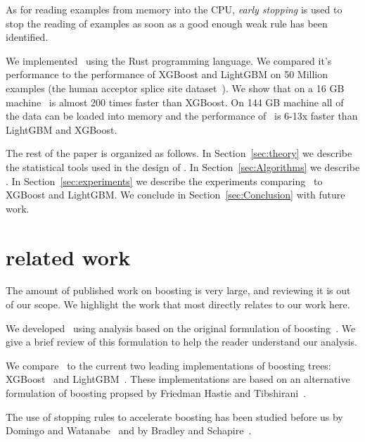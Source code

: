 As for reading examples from memory into the CPU, {\em early stopping}
is used to stop the reading of examples as soon as a good enough weak
rule has been identified.

We implemented \Sparrow\ using the Rust programming language. We
compared it's performance to the performance of XGBoost and LightGBM on
50 Million examples (the human acceptor splice site
dataset~\cite{sonnenburg_coffin_2010, agarwal_reliable_2014}). We
show that on a 16 GB machine \Sparrow\ is almost 200 times faster than
XGBoost. On 144 GB machine all of the data can be loaded into memory
and the performance of \Sparrow\ is 6-13x faster than LightGBM and XGBoost.

The rest of the paper is organized as follows. In Section~\ref{sec:theory} we
describe the statistical tools used in the design of \Sparrow. In
Section~\ref{sec:Algorithms} we describe \Sparrow. In Section~\ref{sec:experiments} we describe
the experiments comparing \Sparrow\ to XGBoost and LightGBM. We
conclude in Section~\ref{sec:Conclusion} with %
future work.

\section{related work}

The amount of published work on boosting is very large, and reviewing
it is out of our scope. We highlight the work that most directly
relates to our work here.

We developed \Sparrow\ using analysis based on the original formulation of
boosting~\cite{freund_alternating_1999, schapire_improved_1999,
  freund_alternating_1999, schapire_boosting:_2012}. We give a brief
review of this formulation to help the reader understand our analysis.

We compare \Sparrow\ to the current two leading implementations
of boosting trees: XGBoost~\cite{chen_xgboost:_2016} and
LightGBM~\cite{ke_lightgbm:_2017}.
These implementations are based on an alternative formulation of
boosting propsed by Friedman Hastie and
Tibshirani~\cite{friedman_additive_2000}.

The use of stopping rules to accelerate boosting has been studied 
before us by Domingo and Watanabe~\cite{domingo_scaling_2000} and by
Bradley and Schapire~\cite{bradley_filterboost:_2007}.


\iffalse

